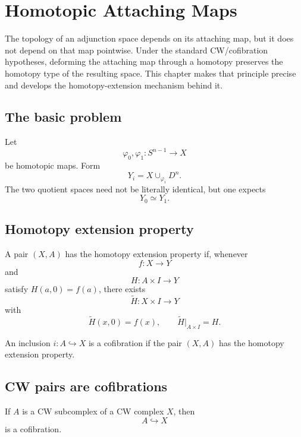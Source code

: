 ﻿\chapter{Homotopic Attaching Maps}
\label{ch:viii08-homotopic-attaching}

The topology of an adjunction space depends on its attaching map, but it does
not depend on that map pointwise.  Under the standard CW/cofibration
hypotheses, deforming the attaching map through a homotopy preserves the
homotopy type of the resulting space.  This chapter makes that principle
precise and develops the homotopy-extension mechanism behind it.

\section{The basic problem}

Let
\[
\varphi_0,\varphi_1:S^{n-1}\to X
\]
be homotopic maps.  Form
\[
Y_i=X\cup_{\varphi_i}D^n.
\]
The two quotient spaces need not be literally identical, but one expects
\[
Y_0\simeq Y_1.
\]

\section{Homotopy extension property}

\begin{definition}
\label{def:viii08-hep}
A pair \((X,A)\) has the homotopy extension property if, whenever
\[
f:X\to Y
\]
and
\[
H:A\times I\to Y
\]
satisfy \(H(a,0)=f(a)\), there exists
\[
\widetilde H:X\times I\to Y
\]
with
\[
\widetilde H(x,0)=f(x),
\qquad
\widetilde H|_{A\times I}=H.
\]
\end{definition}

\begin{definition}[Cofibration]
\label{def:viii08-cofibration}
An inclusion \(i:A\hookrightarrow X\) is a cofibration if the pair
\((X,A)\) has the homotopy extension property.
\end{definition}

\section{CW pairs are cofibrations}

\begin{theorem}
\label{thm:viii08-cw-cofibration}
If \(A\) is a CW subcomplex of a CW complex \(X\), then
\[
A\hookrightarrow X
\]
is a cofibration.
\end{theorem}

